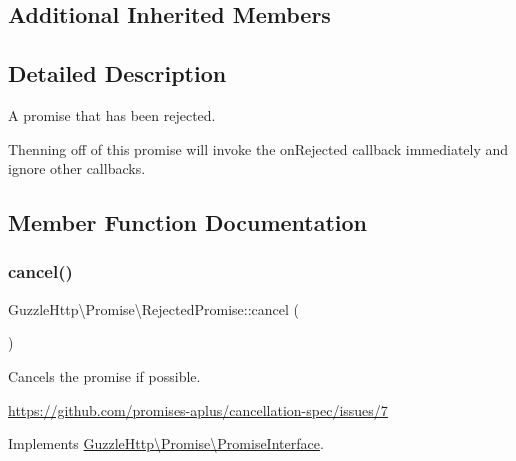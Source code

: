 \subsection*{Additional Inherited Members}


\subsection{Detailed Description}
A promise that has been rejected.

Thenning off of this promise will invoke the on\+Rejected callback immediately and ignore other callbacks. 

\subsection{Member Function Documentation}
\mbox{\label{classGuzzleHttp_1_1Promise_1_1RejectedPromise_a57da0985dd2da478314844a4a1b7d781}} 
\subsubsection{\texorpdfstring{cancel()}{cancel()}}
{\footnotesize\ttfamily Guzzle\+Http\textbackslash{}\+Promise\textbackslash{}\+Rejected\+Promise\+::cancel (\begin{DoxyParamCaption}{ }\end{DoxyParamCaption})}

Cancels the promise if possible.

\hyperlink{}{https\+://github.\+com/promises-\/aplus/cancellation-\/spec/issues/7}

Implements \hyperlink{interfaceGuzzleHttp_1_1Promise_1_1PromiseInterface_ab3f2eb63d775492446ab3784618aeef8}{Guzzle\+Http\textbackslash{}\+Promise\textbackslash{}\+Promise\+Interface}.

\mbox{\label{classGuzzleHttp_1_1Promise_1_1RejectedPromise_a335b97e19692bbbba3718d892d335dd9}} 

